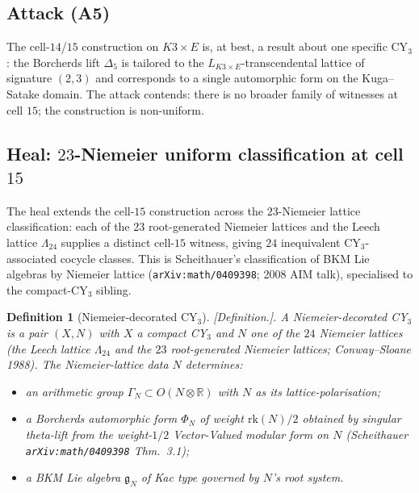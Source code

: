 \documentclass[11pt]{amsart}
\newtheorem{definition}[theorem]{Definition}
\providecommand{\R}{\mathbb{R}}
\providecommand{\ClaimStatusDefinition}{[\emph{Definition.}]}
\begin{document}
\subsection*{Attack (A5)}

The cell-$14$/$15$ construction on $K3 \times E$ is, at best, a result
about one specific CY$_3$: the Borcherds lift $\Delta_5$ is tailored
to the $L_{K3 \times E}$-transcendental lattice of signature $(2, 3)$
and corresponds to a single automorphic form on the Kuga--Satake
domain. The attack contends: there is no broader family of witnesses
at cell $15$; the construction is non-uniform.

\subsection*{Heal: $23$-Niemeier uniform classification at cell $15$}

The heal extends the cell-$15$ construction across the $23$-Niemeier
lattice classification: each of the $23$ root-generated Niemeier
lattices and the Leech lattice $\Lambda_{24}$ supplies a distinct
cell-$15$ witness, giving $24$ inequivalent CY$_3$-associated cocycle
classes. This is Scheithauer's classification of BKM Lie algebras by
Niemeier lattice (\texttt{arXiv:math/0409398}; 2008 AIM talk),
specialised to the compact-CY$_3$ sibling.

\begin{definition}[Niemeier-decorated CY$_3$]
\label{def:R13-niemeier-decorated-cy3}
\ClaimStatusDefinition.
A \emph{Niemeier-decorated CY$_3$} is a pair $(X, N)$ with $X$ a
compact CY$_3$ and $N$ one of the $24$ Niemeier lattices (the Leech
lattice $\Lambda_{24}$ and the $23$ root-generated Niemeier lattices;
Conway--Sloane 1988). The Niemeier-lattice data $N$ determines:
\begin{itemize}
\item an arithmetic group $\Gamma_N \subset O(N \otimes \R)$ with
  $N$ as its lattice-polarisation;
\item a Borcherds automorphic form $\Phi_N$ of weight $\mathrm{rk}(N)/2$
  obtained by singular theta-lift from the weight-$1/2$ Vector-Valued
  modular form on $N$ (Scheithauer \texttt{arXiv:math/0409398}
  Thm.~3.1);
\item a BKM Lie algebra $\mathfrak{g}_N$ of Kac type governed by $N$'s
  root system.
\end{itemize}
\end{definition}
\end{document}
